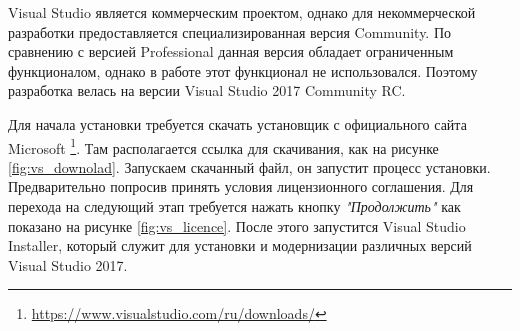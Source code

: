 Visual Studio является коммерческим проектом, однако для некоммерческой разработки предоставляется специализированная версия Community. По сравнению с версией Professional данная версия обладает ограниченным функционалом, однако в работе этот функционал не использовался. Поэтому разработка велась на версии Visual Studio 2017 Community RC.

Для начала установки требуется скачать установщик с официального сайта Microsoft \footnote{\url{https://www.visualstudio.com/ru/downloads/}}. Там располагается ссылка для скачивания, как на рисунке \ref{fig:vs_downolad}. Запускаем скачанный файл, он запустит процесс установки. Предварительно попросив принять условия лицензионного соглашения. Для перехода на следующий этап требуется нажать кнопку \textit{"Продолжить"} как показано на рисунке \ref{fig:vs_licence}. После этого запустится Visual Studio Installer, который служит для установки и модернизации различных версий Visual Studio 2017.

